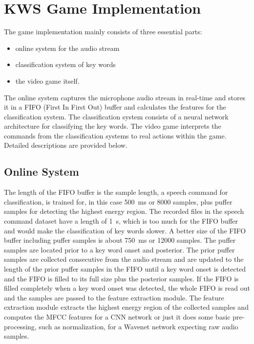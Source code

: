 
\section{KWS Game Implementation}
\thesisStateNotReady
The game implementation mainly consists of three essential parts:
\begin{itemize}
	\item online system for the audio stream
	\item classification system of key words
	\item the video game itself.
\end{itemize}
The online system captures the microphone audio stream in real-time and stores it in a FIFO (First In First Out) buffer and calculates the features for the classification system.
The classification system consists of a neural network architecture for classifying the key words.
The video game interprets the commands from the classification systems to real actions within the game.
Detailed descriptions are provided below.



\subsection{Online System}
The length of the FIFO buffer is the sample length, a speech command for classification, is trained for, in this case \SI{500}{\milli\second} or 8000 samples, plus puffer samples for detecting the highest energy region.
The recorded files in the speech command dataset have a length of \SI{1}{\second}, which is too much for the FIFO buffer and would make the classification of key words slower.
A better size of the FIFO buffer including puffer samples is about \SI{750}{\milli\second} or 12000 samples.
The puffer samples are located prior to a key word onset and posterior.
The prior puffer samples are collected consecutive from the audio stream and are updated to the length of the prior puffer samples in the FIFO until a key word onset is detected and the FIFO is filled to its full size plus the posterior samples.
If the FIFO is filled completely when a key word onset was detected, the whole FIFO is read out and the samples are passed to the feature extraction module.
The feature extraction module extracts the highest energy region of the collected samples and computes the MFCC features for a CNN network or just it does some basic pre-processing, such as normalization, for a Wavenet network expecting raw audio samples.

